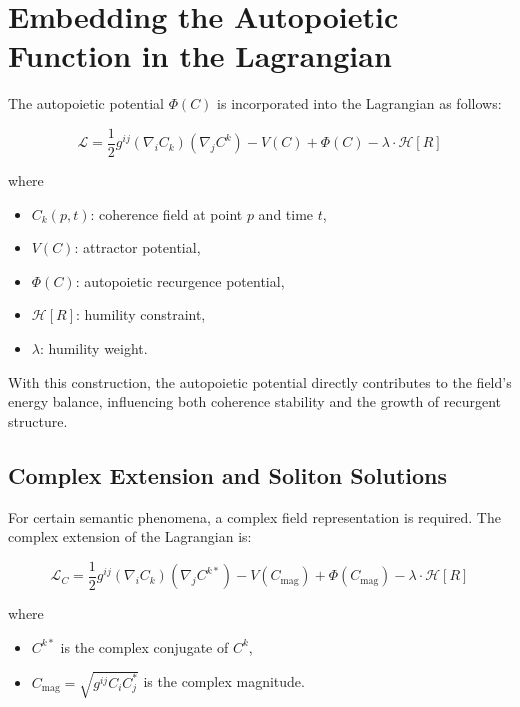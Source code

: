\section{Embedding the Autopoietic Function in the Lagrangian}

The autopoietic potential \(\Phi(C)\) is incorporated into the Lagrangian as follows:

\begin{equation}
\mathcal{L} = \frac{1}{2} g^{ij} (\nabla_i C_k)(\nabla_j C^k) - V(C) + \Phi(C) - \lambda \cdot \mathcal{H}[R]
\end{equation}

where 
\begin{itemize}
    \item \(C_k(p,t)\): coherence field at point \(p\) and time \(t\),
    \item \(V(C)\): attractor potential,
    \item \(\Phi(C)\): autopoietic recurgence potential,
    \item \(\mathcal{H}[R]\): humility constraint,
    \item \(\lambda\): humility weight.
\end{itemize}

With this construction, the autopoietic potential directly contributes to the field's energy balance, influencing both coherence stability and the growth of recurgent structure.

\subsection{Complex Extension and Soliton Solutions}

For certain semantic phenomena, a complex field representation is required. The complex extension of the Lagrangian is:

\begin{equation}
\mathcal{L}_C = \frac{1}{2} g^{ij} (\nabla_i C_k)(\nabla_j C^{k*}) - V(C_{\mathrm{mag}}) + \Phi(C_{\mathrm{mag}}) - \lambda \cdot \mathcal{H}[R]
\end{equation}

where

\begin{itemize}
    \item \(C^{k*}\) is the complex conjugate of \(C^k\),
    \item \(C_{\mathrm{mag}} = \sqrt{g^{ij}C_i C_j^*}\) is the complex magnitude.
\end{itemize}

